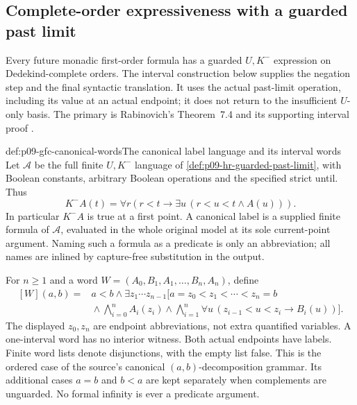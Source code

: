 
\subsection{Complete-order expressiveness with a guarded past limit}
\label{sec:p09-guarded-future-completeness}

Every future monadic first-order formula has a guarded
\(U,K^-\) expression on Dedekind-complete orders. The interval
construction below supplies the negation step and the final syntactic
translation. It uses the actual past-limit operation, including its
value at an actual endpoint; it does not return to the insufficient
\(U\)-only basis. The primary is Rabinovich's Theorem~7.4 and its
supporting interval proof
\cite[secs.~5 and 7, pp.~7--15]{Rabinovich2014Kamp}.

\begin{hbdefinition}{def:p09-gfc-canonical-words}{The canonical label language and its interval words}
Let \(\mathcal A\) be the full finite \(U,K^-\) language of
\cref{def:p09-hr-guarded-past-limit}, with Boolean constants,
arbitrary Boolean operations and the specified strict until. Thus
\[
 K^-A(t)=\forall r\left(r<t\to
                 \exists u\,(r<u<t\land A(u))\right).
\]
In particular \(K^-A\) is true at a first point. A canonical
label is a supplied finite formula of \(\mathcal A\), evaluated
in the whole original model at its sole current-point argument.
Naming such a formula as a predicate is only an abbreviation;
all names are inlined by capture-free substitution in the output.

For \(n\geq1\) and a word
\(W=(A_0,B_1,A_1,\ldots,B_n,A_n)\), define
\[
\begin{split}
 [W](a,b)={}&a<b\land
 \exists z_1\cdots z_{n-1}\bigl[
      a=z_0<z_1<\cdots<z_n=b\\
 &{}\land\bigwedge_{i=0}^n A_i(z_i)
       \land\bigwedge_{i=1}^n
          \forall u\,(z_{i-1}<u<z_i\to B_i(u))\bigr].
\end{split}
\]
The displayed \(z_0,z_n\) are endpoint abbreviations, not
extra quantified variables. A one-interval word has no interior
witness. Both actual endpoints have labels. Finite word lists
denote disjunctions, with the empty list false. This is the
ordered case of the source's canonical
\((a,b)\)-decomposition grammar. Its additional cases \(a=b\)
and \(b<a\) are kept separately when complements are unguarded.
No formal infinity is ever a predicate argument.
\end{hbdefinition}

